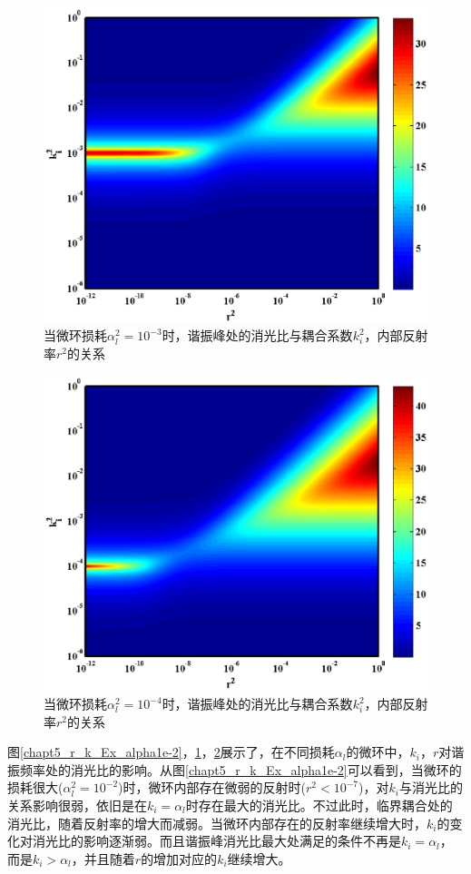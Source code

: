 \begin{figure}[htb]
	\centering
	\includegraphics[width=12cm]{./Pictures/chapt5_r_k_Ex_alpha1e-3.eps}
	\caption{当微环损耗$\alpha_l^2= 10^{-3}$时，谐振峰处的消光比与耦合系数$k_i^2$，内部反射率$r^2$的关系}
	\label{chapt5_r_k_Ex_alpha1e-3}
\end{figure}
\begin{figure}[htb]
	\centering
	\includegraphics[width=12cm]{./Pictures/chapt5_r_k_Ex_alpha1e-4.eps}
	\caption{当微环损耗$\alpha_l^2= 10^{-4}$时，谐振峰处的消光比与耦合系数$k_i^2$，内部反射率$r^2$的关系}
	\label{chapt5_r_k_Ex_alpha1e-4}
\end{figure}
图\ref{chapt5_r_k_Ex_alpha1e-2}，\ref{chapt5_r_k_Ex_alpha1e-3}，\ref{chapt5_r_k_Ex_alpha1e-4}展示了，在不同损耗$\alpha_l$的微环中，$k_i$，$r$对谐振频率处的消光比的影响。从图\ref{chapt5_r_k_Ex_alpha1e-2}可以看到，当微环的损耗很大($\alpha_l^2 = 10^{-2}$)时，微环内部存在微弱的反射时($r^2<10^{-7}$)，对$k_i$与消光比的关系影响很弱，依旧是在$k_i=\alpha_l$时存在最大的消光比。不过此时，临界耦合处的消光比，随着反射率的增大而减弱。当微环内部存在的反射率继续增大时，$k_i$的变化对消光比的影响逐渐弱。而且谐振峰消光比最大处满足的条件不再是$k_i = \alpha_l$，而是$k_i > \alpha_l$，并且随着$r$的增加对应的$k_i$继续增大。

